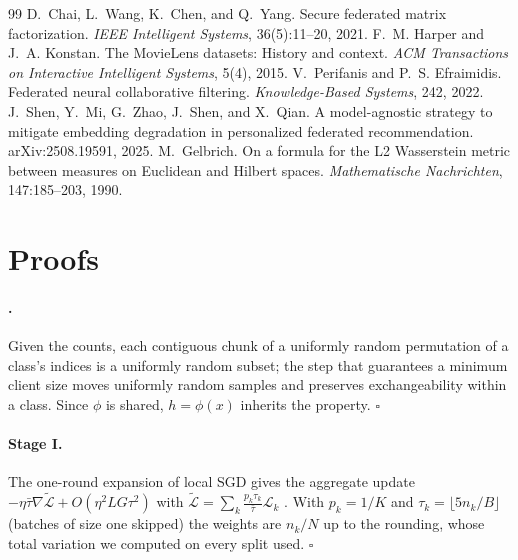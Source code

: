 \documentclass[10pt]{article}
\theoremstyle{plain}
\theoremstyle{definition}
\begin{document}
\begin{thebibliography}{99}
 D.~Chai, L.~Wang, K.~Chen, and Q.~Yang. Secure federated matrix factorization. \emph{IEEE Intelligent Systems}, 36(5):11--20, 2021.
 F.~M. Harper and J.~A. Konstan. The MovieLens datasets: History and context. \emph{ACM Transactions on Interactive Intelligent Systems}, 5(4), 2015.
 V.~Perifanis and P.~S. Efraimidis. Federated neural collaborative filtering. \emph{Knowledge-Based Systems}, 242, 2022.
 J.~Shen, Y.~Mi, G.~Zhao, J.~Shen, and X.~Qian. A model-agnostic strategy to mitigate embedding degradation in personalized federated recommendation. arXiv:2508.19591, 2025.
 M.~Gelbrich. On a formula for the L2 Wasserstein metric between measures on Euclidean and Hilbert spaces. \emph{Mathematische Nachrichten}, 147:185--203, 1990.
\end{thebibliography}
\normalsize

\clearpage
\appendix
\section{Proofs}\label{app:proofs}

\paragraph{.} Given the counts, each contiguous chunk of a uniformly random permutation of a
class's indices is a uniformly random subset; the step that guarantees a minimum client size moves uniformly random
samples and preserves exchangeability within a class. Since $\phi$ is shared, $h=\phi(x)$ inherits the property.
\hfill$\square$

\paragraph{Stage I.} The one-round expansion of local SGD gives the aggregate update
$-\eta\bar\tau\nabla\tilde{\mathcal L}+O(\eta^2LG\tau^2)$ with $\tilde{\mathcal L}=\sum_k\frac{p_k\tau_k}{\bar\tau}\mathcal L_k$
\cite{wang2020fednova}. With $p_k=1/K$ and $\tau_k=\lfloor 5n_k/B\rfloor$ (batches of size one skipped) the weights are
$n_k/N$ up to the rounding, whose total variation we computed on every split used. \hfill$\square$
\end{document}
